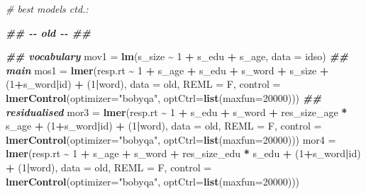 \documentclass[
]{article}
\newenvironment{Shaded}{\begin{snugshade}}{\end{snugshade}}
\newcommand{\AttributeTok}[1]{\textcolor[rgb]{0.13,0.29,0.53}{#1}}
\newcommand{\CommentTok}[1]{\textcolor[rgb]{0.56,0.35,0.01}{\textit{#1}}}
\newcommand{\DecValTok}[1]{\textcolor[rgb]{0.00,0.00,0.81}{#1}}
\newcommand{\DocumentationTok}[1]{\textcolor[rgb]{0.56,0.35,0.01}{\textbf{\textit{#1}}}}
\newcommand{\FunctionTok}[1]{\textcolor[rgb]{0.13,0.29,0.53}{\textbf{#1}}}
\newcommand{\NormalTok}[1]{#1}
\newcommand{\OtherTok}[1]{\textcolor[rgb]{0.56,0.35,0.01}{#1}}
\newcommand{\SpecialCharTok}[1]{\textcolor[rgb]{0.81,0.36,0.00}{\textbf{#1}}}
\newcommand{\StringTok}[1]{\textcolor[rgb]{0.31,0.60,0.02}{#1}}
\begin{document}
\begin{Shaded}
\begin{Highlighting}[]
\CommentTok{\# best models ctd.:}

\DocumentationTok{\#\# {-}{-} old {-}{-} \#\#}

\DocumentationTok{\#\# vocabulary}
\NormalTok{mov1 }\OtherTok{=} \FunctionTok{lm}\NormalTok{(s\_size }\SpecialCharTok{\textasciitilde{}} \DecValTok{1} \SpecialCharTok{+}\NormalTok{ s\_edu }\SpecialCharTok{+}\NormalTok{ s\_age, }\AttributeTok{data =}\NormalTok{ idso)}
\DocumentationTok{\#\# main}
\NormalTok{mos1 }\OtherTok{=} \FunctionTok{lmer}\NormalTok{(resp.rt }\SpecialCharTok{\textasciitilde{}} \DecValTok{1} \SpecialCharTok{+}\NormalTok{ s\_age }\SpecialCharTok{+}\NormalTok{ s\_edu }\SpecialCharTok{+}\NormalTok{ s\_word }\SpecialCharTok{+}\NormalTok{ s\_size }\SpecialCharTok{+}\NormalTok{ (}\DecValTok{1}\SpecialCharTok{+}\NormalTok{s\_word}\SpecialCharTok{|}\NormalTok{id) }\SpecialCharTok{+}\NormalTok{ (}\DecValTok{1}\SpecialCharTok{|}\NormalTok{word), }\AttributeTok{data =}\NormalTok{ old, }\AttributeTok{REML =}\NormalTok{ F, }\AttributeTok{control =} \FunctionTok{lmerControl}\NormalTok{(}\AttributeTok{optimizer=}\StringTok{"bobyqa"}\NormalTok{, }\AttributeTok{optCtrl=}\FunctionTok{list}\NormalTok{(}\AttributeTok{maxfun=}\DecValTok{20000}\NormalTok{)))}
\DocumentationTok{\#\# residualised}
\NormalTok{mor3 }\OtherTok{=} \FunctionTok{lmer}\NormalTok{(resp.rt }\SpecialCharTok{\textasciitilde{}} \DecValTok{1} \SpecialCharTok{+}\NormalTok{ s\_edu }\SpecialCharTok{+}\NormalTok{ s\_word }\SpecialCharTok{+}\NormalTok{ res\_size\_age }\SpecialCharTok{*}\NormalTok{ s\_age }\SpecialCharTok{+}\NormalTok{ (}\DecValTok{1}\SpecialCharTok{+}\NormalTok{s\_word}\SpecialCharTok{|}\NormalTok{id) }\SpecialCharTok{+}\NormalTok{ (}\DecValTok{1}\SpecialCharTok{|}\NormalTok{word), }\AttributeTok{data =}\NormalTok{ old, }\AttributeTok{REML =}\NormalTok{ F, }\AttributeTok{control =} \FunctionTok{lmerControl}\NormalTok{(}\AttributeTok{optimizer=}\StringTok{"bobyqa"}\NormalTok{, }\AttributeTok{optCtrl=}\FunctionTok{list}\NormalTok{(}\AttributeTok{maxfun=}\DecValTok{20000}\NormalTok{)))}
\NormalTok{mor4 }\OtherTok{=} \FunctionTok{lmer}\NormalTok{(resp.rt }\SpecialCharTok{\textasciitilde{}} \DecValTok{1} \SpecialCharTok{+}\NormalTok{ s\_age }\SpecialCharTok{+}\NormalTok{ s\_word }\SpecialCharTok{+}\NormalTok{ res\_size\_edu }\SpecialCharTok{*}\NormalTok{ s\_edu }\SpecialCharTok{+}\NormalTok{ (}\DecValTok{1}\SpecialCharTok{+}\NormalTok{s\_word}\SpecialCharTok{|}\NormalTok{id) }\SpecialCharTok{+}\NormalTok{ (}\DecValTok{1}\SpecialCharTok{|}\NormalTok{word), }\AttributeTok{data =}\NormalTok{ old, }\AttributeTok{REML =}\NormalTok{ F, }\AttributeTok{control =} \FunctionTok{lmerControl}\NormalTok{(}\AttributeTok{optimizer=}\StringTok{"bobyqa"}\NormalTok{, }\AttributeTok{optCtrl=}\FunctionTok{list}\NormalTok{(}\AttributeTok{maxfun=}\DecValTok{20000}\NormalTok{)))}
\end{Highlighting}
\end{Shaded}
\end{document}
